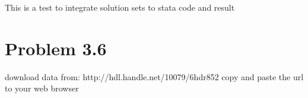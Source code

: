 \documentclass[a4paper]{article}
\begin{document}
This is a test to integrate solution sets to stata code and result
\section*{Problem 3.6}
download data from: http://hdl.handle.net/10079/6hdr852
copy and paste the url to your web browser
\begin{stlog}\end{stlog}
\end{document}
